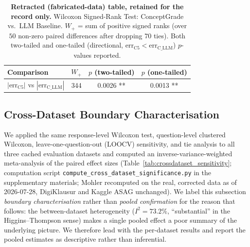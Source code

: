 \documentclass[conference]{IEEEtran}
\begin{document}
\begin{table}[t]
\caption{\textbf{Retracted (fabricated-data) table, retained for the record only.}
Wilcoxon Signed-Rank Test: ConceptGrade vs.\ LLM Baseline. $W_+$ = sum
of positive signed ranks (over $50$ non-zero paired differences after dropping
$70$ ties). Both two-tailed and one-tailed (directional, $\text{err}_{\text{C5}}
< \text{err}_{\text{C\_LLM}}$) $p$-values reported.}
\label{tab:significance}
\centering
\begin{tabular}{lccc}
\toprule
\textbf{Comparison} & \textbf{$W_+$} & \textbf{$p$ (two-tailed)} & \textbf{$p$ (one-tailed)} \\
\midrule
$|\text{err}_{\text{C5}}|$ vs $|\text{err}_{\text{C\_LLM}}|$ & 344 & 0.0026 ** & 0.0013 ** \\
\bottomrule
\end{tabular}
\end{table}

\subsection{Cross-Dataset Boundary Characterisation}
\label{subsec:crossdataset_sig}

We applied the same response-level Wilcoxon test, question-level clustered
Wilcoxon, leave-one-question-out (LOOCV) sensitivity, and tie analysis to all
three cached evaluation datasets and computed an inverse-variance-weighted
meta-analysis of the paired effect sizes
(Table~\ref{tab:crossdataset_sensitivity}; computation script
\texttt{compute\_cross\_dataset\_significance.py} in the supplementary
materials; Mohler recomputed on the real, corrected data as of
2026-07-28, DigiKlausur and Kaggle ASAG unchanged). We label this
subsection \emph{boundary characterisation}
rather than \emph{pooled confirmation} for the reason that follows: the
between-dataset heterogeneity ($I^2 = 73.2\%$, ``substantial'' in the
Higgins--Thompson sense) makes a single pooled effect a poor summary of the
underlying picture. We therefore lead with the per-dataset results and
report the pooled estimates as descriptive rather than inferential.
\end{document}
